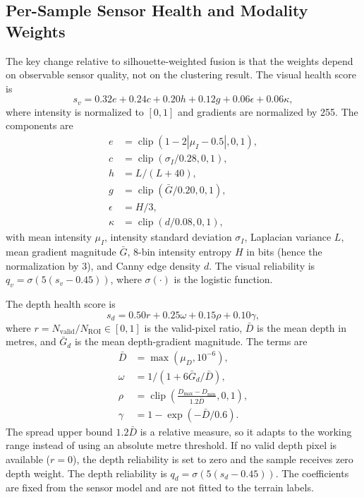 \documentclass[final,3p,times]{elsarticle}
\begin{document}
\subsection{Per-Sample Sensor Health and Modality Weights}
\label{subsec:weights}
The key change relative to silhouette-weighted fusion is that the weights depend on observable sensor quality, not on the clustering result. The visual health score is
\begin{equation}
s_v = 0.32 e + 0.24 c + 0.20 h + 0.12 g + 0.06 \epsilon + 0.06 \kappa,
\label{eq:sv}
\end{equation}
where intensity is normalized to $[0,1]$ and gradients are normalized by 255. The components are
\begin{equation}
\begin{aligned}
e &= \operatorname{clip}(1-2|\mu_I-0.5|,0,1), \\
c &= \operatorname{clip}(\sigma_I/0.28,0,1), \\
h &= L/(L+40), \\
g &= \operatorname{clip}(\bar{G}/0.20,0,1), \\
\epsilon &= H/3, \\
\kappa &= \operatorname{clip}(d/0.08,0,1),
\end{aligned}
\label{eq:visual_terms}
\end{equation}
with mean intensity $\mu_I$, intensity standard deviation $\sigma_I$, Laplacian variance $L$, mean gradient magnitude $\bar{G}$, 8-bin intensity entropy $H$ in bits (hence the normalization by 3), and Canny edge density $d$. The visual reliability is $q_v=\sigma(5(s_v-0.45))$, where $\sigma(\cdot)$ is the logistic function.

The depth health score is
\begin{equation}
s_d = 0.50 r + 0.25 \omega + 0.15 \rho + 0.10 \gamma,
\label{eq:sd}
\end{equation}
where $r=N_{\mathrm{valid}}/N_{\mathrm{ROI}}\in[0,1]$ is the valid-pixel ratio, $\bar{D}$ is the mean depth in metres, and $\bar{G}_d$ is the mean depth-gradient magnitude. The terms are
\begin{equation}
\begin{aligned}
\bar{D} &= \max(\mu_D,10^{-6}), \\
\omega &= 1/(1+6\bar{G}_d/\bar{D}), \\
\rho &= \operatorname{clip}\!\left(\frac{D_{\max}-D_{\min}}{1.2\bar{D}},0,1\right), \\
\gamma &= 1-\exp(-\bar{D}/0.6).
\end{aligned}
\label{eq:depth_terms}
\end{equation}
The spread upper bound $1.2\bar{D}$ is a relative measure, so it adapts to the working range instead of using an absolute metre threshold. If no valid depth pixel is available ($r=0$), the depth reliability is set to zero and the sample receives zero depth weight. The depth reliability is $q_d=\sigma(5(s_d-0.45))$. The coefficients are fixed from the sensor model and are not fitted to the terrain labels.
\end{document}
